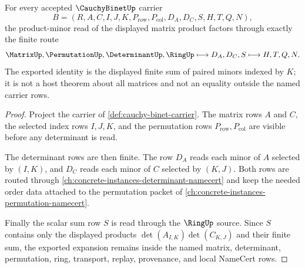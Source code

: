 \begin{theorem}\label{thm:cauchy-binet-minor-expansion}
For every accepted $\CauchyBinetUp$ carrier
$$
B=(R,A,C,I,J,K,P_{\mathrm{row}},P_{\mathrm{col}},D_A,D_C,S,H,T,Q,N),
$$
the product-minor read of the displayed matrix product factors through exactly the finite route
$$
\MatrixUp,\PermutationUp,\DeterminantUp,\RingUp \longmapsto D_A,D_C,S \longmapsto H,T,Q,N .
$$
The exported identity is the displayed finite sum of paired minors indexed by $K$; it is not a host theorem about all matrices and not an equality outside the named carrier rows.
\end{theorem}
\begin{proof}
Project the carrier of \autoref{def:cauchy-binet-carrier}. The matrix rows $A$ and $C$, the selected index rows $I,J,K$, and the permutation rows $P_{\mathrm{row}},P_{\mathrm{col}}$ are visible before any determinant is read.

The determinant rows are then finite. The row $D_A$ reads each minor of $A$ selected by $(I,K)$, and $D_C$ reads each minor of $C$ selected by $(K,J)$. Both rows are routed through \autoref{ch:concrete-instances-determinant-namecert} and keep the needed order data attached to the permutation packet of \autoref{ch:concrete-instances-permutation-namecert}.

Finally the scalar sum row $S$ is read through the $\RingUp$ source. Since $S$ contains only the displayed products $\det(A_{I,K})\det(C_{K,J})$ and their finite sum, the exported expansion remains inside the named matrix, determinant, permutation, ring, transport, replay, provenance, and local NameCert rows.
\end{proof}


